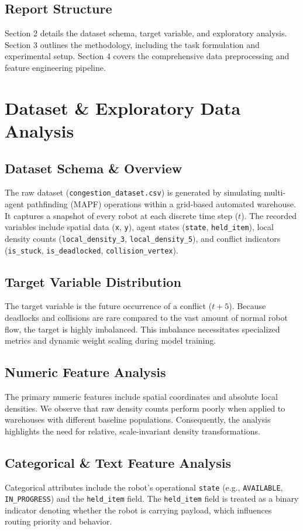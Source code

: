 \documentclass[12pt]{article}
\begin{document}
\subsection{Report Structure}
Section 2 details the dataset schema, target variable, and exploratory analysis. Section 3 outlines the methodology, including the task formulation and experimental setup. Section 4 covers the comprehensive data preprocessing and feature engineering pipeline.

\section{Dataset \& Exploratory Data Analysis}

\subsection{Dataset Schema \& Overview}
The raw dataset (\texttt{congestion\_dataset.csv}) is generated by simulating multi-agent pathfinding (MAPF) operations within a grid-based automated warehouse. It captures a snapshot of every robot at each discrete time step ($t$). The recorded variables include spatial data (\texttt{x}, \texttt{y}), agent states (\texttt{state}, \texttt{held\_item}), local density counts (\texttt{local\_density\_3}, \texttt{local\_density\_5}), and conflict indicators (\texttt{is\_stuck}, \texttt{is\_deadlocked}, \texttt{collision\_vertex}).

\subsection{Target Variable Distribution}
The target variable is the future occurrence of a conflict ($t+5$). Because deadlocks and collisions are rare compared to the vast amount of normal robot flow, the target is highly imbalanced. This imbalance necessitates specialized metrics and dynamic weight scaling during model training.

\subsection{Numeric Feature Analysis}
The primary numeric features include spatial coordinates and absolute local densities. We observe that raw density counts perform poorly when applied to warehouses with different baseline populations. Consequently, the analysis highlights the need for relative, scale-invariant density transformations.

\subsection{Categorical \& Text Feature Analysis}
Categorical attributes include the robot's operational \texttt{state} (e.g., \texttt{AVAILABLE}, \texttt{IN\_PROGRESS}) and the \texttt{held\_item} field. The \texttt{held\_item} field is treated as a binary indicator denoting whether the robot is carrying payload, which influences routing priority and behavior.
\end{document}
